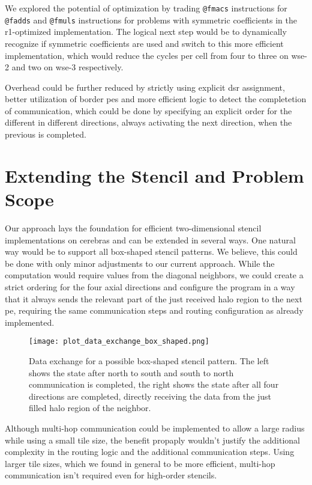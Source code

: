We explored the potential of optimization by trading \texttt{@fmacs} instructions for \texttt{@fadds} and \texttt{@fmuls} instructions for problems with symmetric coefficients in the r1-optimized implementation. The logical next step would be to dynamically recognize if symmetric coefficients are used and switch to  this more efficient implementation, which would reduce the cycles per cell from four to three on \ac{wse}-2 and two on \ac{wse}-3 respectively.

Overhead could be further reduced by strictly using explicit \ac{dsr} assignment, better utilization of border \acp{pe} and more efficient logic to detect the completetion of communication, which could be done by specifying an explicit order for the different in different directions, always activating the next direction, when the previous is completed.

\section{Extending the Stencil and Problem Scope}
Our approach lays the foundation for efficient two-dimensional stencil implementations on cerebras and can be extended in several ways.
One natural way would be to support all box-shaped stencil patterns.
We believe, this could be done with only minor adjustments to our current approach.
While the computation would require values from the diagonal neighbors, we could create a strict ordering for the four axial directions and configure the program in a way that it always sends the relevant part of the just received halo region to the next \ac{pe}, requiring the same communication steps and routing configuration as already implemented.

\begin{figure}[H]
    \centering
    \texttt{[image: plot\_data\_exchange\_box\_shaped.png]}
    \caption{Data exchange for a possible box-shaped stencil pattern. The left shows the state after north to south and south to north communication is completed, the right shows the state after all four directions are completed, directly receiving the data from the just filled halo region of the neighbor.}
    \label{fig:data_exchange_box_shaped}
\end{figure}

Although multi-hop communication could be implemented to allow a large radius while using a small tile size, the benefit propaply wouldn't justify the additional complexity in the routing logic and the additional communication steps. Using larger tile sizes, which we found in general to be more efficient, multi-hop communication isn't required even for high-order stencils.

